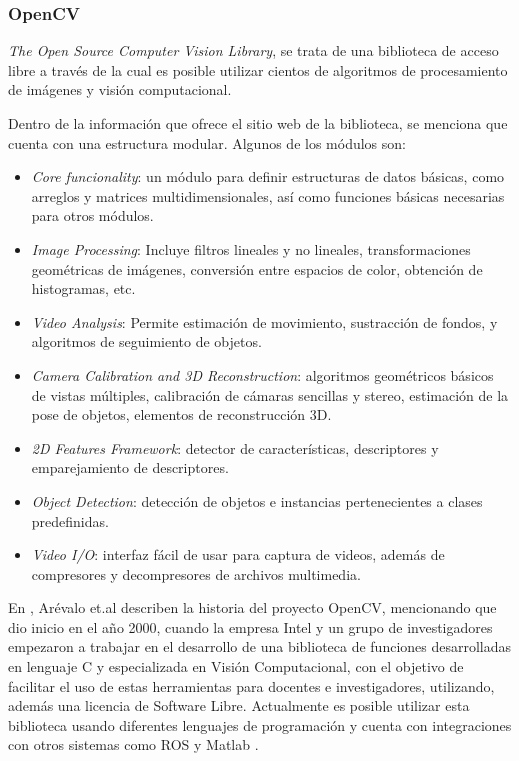             
            \subsubsection{OpenCV}
            \textit{The Open Source Computer Vision Library}, se trata de una biblioteca de acceso libre a través de la cual es posible utilizar cientos de algoritmos de procesamiento de imágenes y visión computacional.
            
            Dentro de la información que ofrece el sitio web de la biblioteca, se menciona que cuenta con una estructura modular. Algunos de los módulos son:
            \begin{itemize}
                \item \textit{Core funcionality}: un módulo para definir estructuras de datos básicas, como arreglos y matrices multidimensionales, así como funciones básicas necesarias para otros módulos.
                \item \textit{Image Processing}: Incluye filtros lineales y no lineales, transformaciones geométricas de imágenes, conversión entre espacios de color, obtención de histogramas, etc.
                \item \textit{Video Analysis}: Permite estimación de movimiento, sustracción de fondos, y algoritmos de seguimiento de objetos. 
                \item \textit{Camera Calibration and 3D Reconstruction}: algoritmos geométricos básicos de vistas múltiples, calibración de cámaras sencillas y stereo, estimación de la pose de objetos, elementos de reconstrucción 3D.
                \item \textit{2D Features Framework}: detector de características, descriptores y emparejamiento de descriptores. 
                \item \textit{Object Detection}: detección de objetos e instancias pertenecientes a clases predefinidas.
                \item \textit{Video I/O}: interfaz fácil de usar para captura de videos, además de compresores y decompresores de archivos multimedia.
            \end{itemize}
            \cite{OpvenCV-website}

            En \cite{arevalo_librerivision_nodate}, Arévalo et.al describen la historia del proyecto OpenCV, mencionando que dio inicio en el año 2000, cuando la empresa Intel y un grupo de investigadores empezaron a trabajar en el desarrollo de una biblioteca de funciones desarrolladas en lenguaje C y especializada en Visión Computacional, con el objetivo de facilitar el uso de estas herramientas para docentes e investigadores, utilizando, además una licencia de Software Libre. 
            Actualmente es posible utilizar esta biblioteca usando diferentes lenguajes de programación y cuenta con integraciones con otros sistemas como ROS y Matlab \textregistered.

